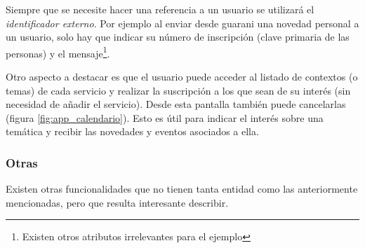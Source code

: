 

Siempre que se necesite hacer una referencia a un usuario se utilizará el \textit{identificador externo}. Por ejemplo al enviar desde \gls{guarani} una novedad personal a un usuario, solo hay que indicar su número de inscripción (clave primaria de las personas) y el mensaje\footnote{Existen otros atributos irrelevantes para el ejemplo}.

Otro aspecto a destacar es que el usuario puede acceder al listado de contextos (o temas) de cada servicio y realizar la suscripción a los que sean de su interés (sin necesidad de añadir el servicio). Desde esta pantalla también puede cancelarlas (figura \ref{fig:app_calendario}). Esto es útil para indicar el interés sobre una temática y recibir las novedades y eventos asociados a ella.



\subsubsection{Otras}
\label{funcionalidad_otras}

Existen otras funcionalidades que no tienen tanta entidad como las anteriormente mencionadas, pero que resulta interesante describir.

